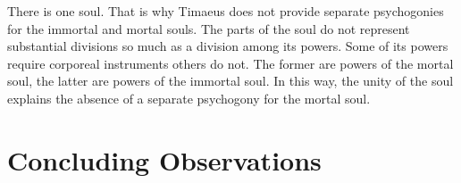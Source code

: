 There is one soul. That is why Timaeus does not provide separate psychogonies for the immortal and mortal souls. The parts of the soul do not represent substantial divisions so much as a division among its powers. Some of its powers require corporeal instruments others do not. The former are powers of the mortal soul, the latter are powers of the immortal soul. In this way, the unity of the soul explains the absence of a separate psychogony for the mortal soul.


\section{Concluding Observations} %
\label{sec:concluding_observations}




